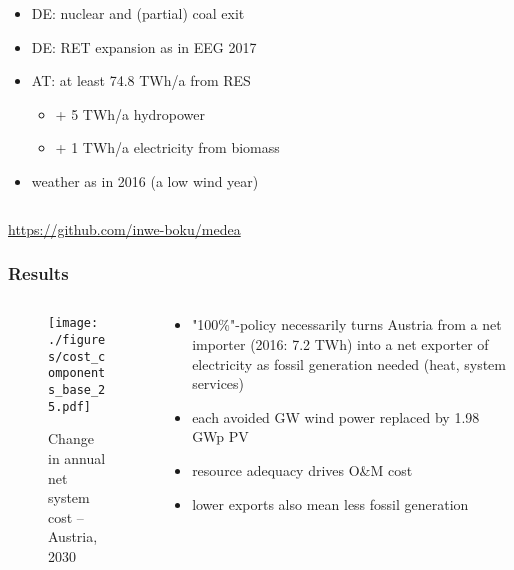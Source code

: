 \documentclass[aspectratio=1610, xcolor=dvipsnames]{beamer}
\begin{document}
\begin{frame}
\begin{columns}[T]
            \begin{column}{7cm}
                \begin{itemize}
                    \item DE: nuclear and (partial) coal exit
                    \item DE: RET expansion as in EEG 2017
                    \item AT: at least 74.8 TWh/a from RES
                    \begin{itemize}
                        \item + 5 TWh/a hydropower
                        \item + 1 TWh/a electricity from biomass
                    \end{itemize}
                    \item weather as in 2016 (a low wind year)
                \end{itemize}
            \end{column}
        \end{columns}
        \bigskip
        \begin{center}
            \url{https://github.com/inwe-boku/medea}
        \end{center}
    \end{frame}

    \begin{frame}
        \frametitle{Results}
        \begin{columns}[T]
            \begin{column}{10.6 cm}
                \begin{figure}
                    \caption{Change in annual net system cost -- Austria, 2030}
                    \texttt{[image: ./figures/cost\_components\_base\_25.pdf]} \label{fig:cost_breakdown}
                \end{figure}
            \end{column}
            \begin{column}{5.0 cm}
                \bigskip
                \begin{itemize}
                    \item "100\%"-policy necessarily turns Austria from a net importer (2016: 7.2 TWh) into a
                    net exporter of electricity as fossil generation needed (heat, system services)
                    \item each avoided GW wind power replaced by 1.98 GWp PV
                    \item resource adequacy drives O\&M cost
                    \item lower exports also mean less fossil generation
                \end{itemize}
            \end{column}
        \end{columns}
    \end{frame}
\end{document}

